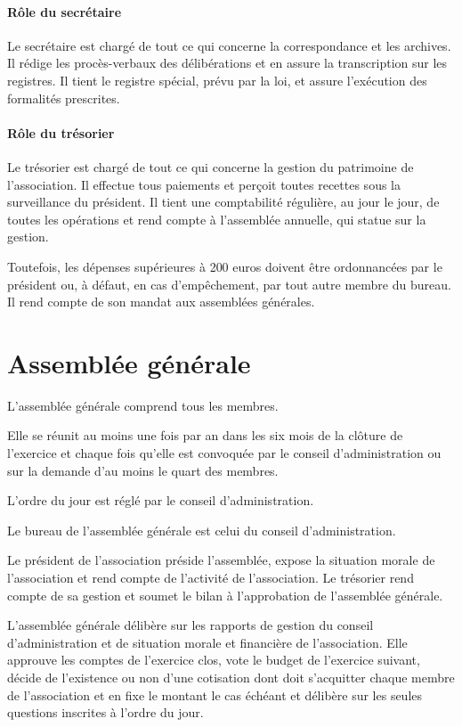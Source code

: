 \documentclass[12 pt]{article}
\begin{document}
\paragraph{Rôle du secrétaire}

Le secrétaire est chargé de tout ce qui concerne la correspondance et
les archives.  Il rédige les procès-verbaux des délibérations et en
assure la transcription sur les registres.  Il tient le registre
spécial, prévu par la loi, et assure l'exécution des formalités
prescrites.

\paragraph{Rôle du trésorier}

Le trésorier est chargé de tout ce qui concerne la gestion du
patrimoine de l'association. Il effectue tous paiements et perçoit
toutes recettes sous la surveillance du président.  Il tient une
comptabilité régulière, au jour le jour, de toutes les opérations et
rend compte à l'assemblée annuelle, qui statue sur la
gestion.

Toutefois, les dépenses supérieures à 200 euros doivent être
ordonnancées par le président ou, à défaut, en cas d'empêchement, par
tout autre membre du bureau. Il rend compte de son mandat aux
assemblées générales.

\section{Assemblée générale}
\label{sec:assemblee-generale}

L'assemblée générale comprend tous les membres.

Elle se réunit au moins une fois par an dans les six mois de la
clôture de l'exercice et chaque fois qu'elle est convoquée par le
conseil d'administration ou sur la demande d'au moins le quart des
membres.

L'ordre du jour est réglé par le conseil d'administration.

Le bureau de l'assemblée générale est celui du conseil d'administration.

Le président de l'association préside l'assemblée, expose la situation
morale de l'association et rend compte de l'activité de
l'association. Le trésorier rend compte de sa gestion et soumet le
bilan à l'approbation de l'assemblée générale.

L'assemblée générale délibère sur les rapports de gestion du conseil
d'administration et de situation morale et financière de
l'association. Elle approuve les comptes de l'exercice clos, vote le
budget de l'exercice suivant, décide de l'existence ou non d'une
cotisation dont doit s'acquitter chaque membre de l'association et en
fixe le montant le cas échéant et délibère sur les seules questions
inscrites à l'ordre du jour.
\end{document}
